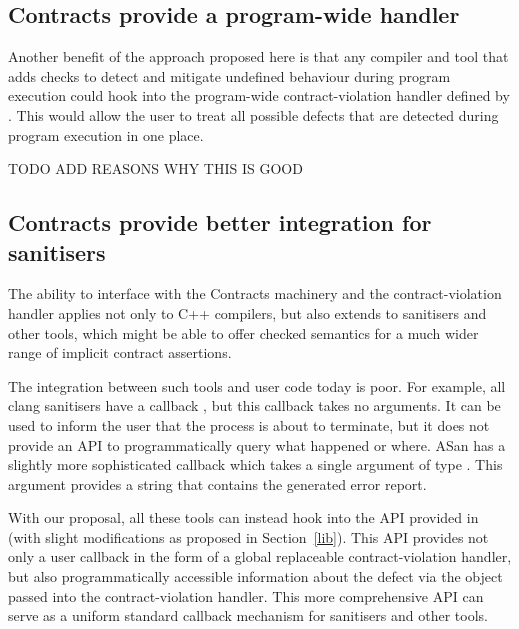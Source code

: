 \subsection{Contracts provide a program-wide handler}
\label{handler}

Another benefit of the approach proposed here is that any compiler and tool that adds checks to detect and mitigate undefined behaviour during program execution could hook into the program-wide contract-violation handler defined by \cite{P2900R8}. This would allow the user to treat all possible defects that are detected during program execution in one place.

TODO ADD REASONS WHY THIS IS GOOD

\subsection{Contracts provide better integration for sanitisers}
\label{sanitisers}

The ability to interface with the Contracts machinery and the contract-violation handler applies not only to C++ compilers, but also extends to sanitisers and other tools, which might be able to offer checked semantics for a much wider range of implicit contract assertions.

The integration between such tools and user code today is poor. For example, all clang sanitisers have a callback , but this callback takes no arguments. It can be used to inform the user that the process is about to terminate, but it does not provide an API to programmatically query what happened or where. ASan has a slightly more sophisticated callback  which takes a single argument of type . This argument provides a string that contains the generated error report.

With our proposal, all these tools can instead hook into the API provided in \cite{P2900R8} (with slight modifications as proposed in Section~\ref{lib}). This API provides not only a user callback in the form of a global replaceable contract-violation handler, but also programmatically accessible information about the defect via the  \mbox{} object passed into the contract-violation handler. This more comprehensive API can serve as a uniform standard callback mechanism for sanitisers and other tools.

